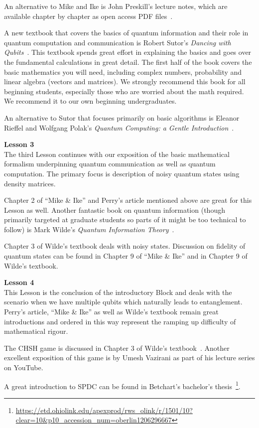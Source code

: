 An alternative to Mike and Ike is John Preskill's lecture notes, which are available chapter by chapter as open access PDF files~\cite{preskill:PH-CS219}.

A new textbook that covers the basics of quantum information and their role in quantum computation and communication is Robert Sutor's \emph{Dancing with Qubits}~\cite{sutor19:dancing}. This textbook spends great effort in explaining the basics and goes over the fundamental calculations in great detail. The first half of the book covers the basic mathematics you will need, including complex numbers, probability and linear algebra (vectors and matrices). We strongly recommend this book for all beginning students, especially those who are worried about the math required. We recommend it to our own beginning undergraduates.

An alternative to Sutor that focuses primarily on basic algorithms is Eleanor Rieffel and Wolfgang Polak's \emph{Quantum Computing: a Gentle Introduction}~\cite{rieffel2011quantum}.

{\bf Lesson 3}\\

The third Lesson continues with our exposition of the basic mathematical formalism underpinning quantum communication as well as quantum computation. The primary focus is description of noisy quantum states using density matrices.

Chapter 2 of “Mike \& Ike” and Perry’s article mentioned above are great for this Lesson as well. Another fantastic book on quantum information (though primarily targeted at graduate students so parts of it might be too technical to follow) is Mark Wilde's \emph{Quantum Information Theory}~\cite{wilde2013quantum}.

Chapter 3 of Wilde’s textbook deals with noisy states. Discussion on fidelity of quantum states can be found in Chapter 9 of “Mike \& Ike” and in Chapter 9 of Wilde’s textbook.

{\bf Lesson 4}\\

This Lesson is the conclusion of the introductory Block and deals with the scenario when we have multiple qubits which naturally leads to entanglement. Perry’s article, “Mike \& Ike” as well as Wilde’s textbook remain great introductions and ordered in this way represent the ramping up difficulty of mathematical rigour. 

The CHSH game is discussed in Chapter 3 of Wilde’s textbook~\cite{wilde2013quantum}. Another excellent exposition of this game is by Umesh Vazirani as part of his lecture series on YouTube.

A great introduction to SPDC can be found in Betchart’s bachelor's thesis~\footnote{\url{https://etd.ohiolink.edu/apexprod/rws_olink/r/1501/10?clear=10&p10_accession_num=oberlin1206296667}}.

